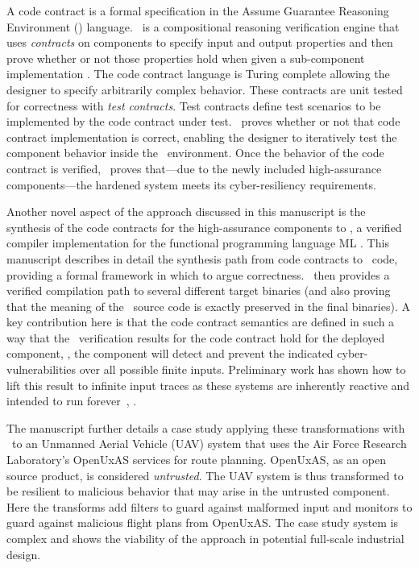 A code contract is a formal specification in the Assume Guarantee Reasoning
Environment (\agr) language.
\agr\ is a compositional reasoning verification engine that uses \emph{contracts} on components to specify input and output properties and then prove whether or not those properties hold when given a sub-component implementation \cite{agree2013}.
The code contract language is Turing complete allowing the designer to specify arbitrarily complex behavior.
These contracts are unit tested for correctness with \emph{test contracts}.
Test contracts define test scenarios to be implemented by the code contract under test. 
\agr\ proves whether or not that code contract implementation is correct, enabling the designer to iteratively test the component behavior inside the \brfcs\ environment.
Once the behavior of the code contract is verified, \agr\ proves that---due to the newly
included high-assurance components---the hardened system meets its
cyber-resiliency requirements.

Another novel aspect of the approach discussed in this manuscript is the synthesis of the code contracts for the high-assurance components to \ckml, a verified
compiler implementation for the functional programming language
ML \cite{cakeml}. 
This manuscript describes in detail the synthesis path
from code contracts to \ckml\ code, providing a formal framework in
which to argue correctness. \ckml\ then provides a verified
compilation path to several different target binaries (and also
proving that the meaning of the \ckml\ source code is exactly
preserved in the final binaries). 
A key contribution here is that the code contract semantics are defined in such a way that the \agr\ verification 
results for the code contract hold for the deployed component, \ie, the component will detect
and prevent the indicated cyber-vulnerabilities over all possible
finite inputs. Preliminary work has shown how to lift this result to
infinite input traces as these systems are inherently reactive and
intended to run forever~\cite{case-verified-filter}, \cite{cakeml-space-cost}.

The manuscript further details a 
case study applying these transformations with \brfcs\ to an Unmanned Aerial
Vehicle (UAV) system that uses the Air Force Research Laboratory's
OpenUxAS services for route planning.
OpenUxAS, as an open source product, is considered \emph{untrusted}.
The UAV system is thus transformed to be resilient to malicious behavior that may arise in the untrusted component.
Here the transforms add filters to guard
against malformed input and monitors to guard against malicious flight plans from OpenUxAS. The case study
system is complex and shows
the viability of the approach in potential full-scale industrial
design.

